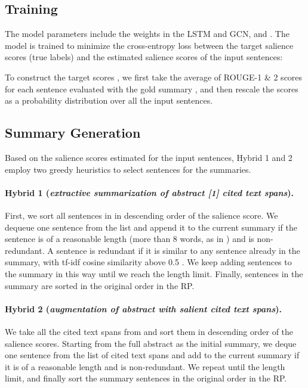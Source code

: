 \documentclass[letterpaper]{article} \usepackage{aaai19}  \usepackage{times}  \usepackage{helvet}  \usepackage{courier}  \usepackage{url}
\begin{document}
\subsection{Training}
The model parameters include the weights in the LSTM and GCN, and
.
The model is trained to minimize the cross-entropy loss between the target salience scores (true labels)  and the estimated salience scores  of the input sentences:

To construct the target scores , we first take the average of ROUGE-1 \& 2 scores for each sentence  evaluated with the gold summary \cite{cao2015ranking}, and then
rescale the
scores as a probability distribution over all the input sentences.



\subsection{Summary Generation}
Based on the salience scores estimated for the input sentences, Hybrid 1 and 2 employ two greedy heuristics to select sentences for the summaries.


\paragraph{Hybrid 1 ({\em extractive summarization of abstract \scalebox{0.95}[1]{} cited text spans}).}
First, we sort all sentences in  in descending order of the salience score.
We dequeue one sentence from the list and append it to the current summary if the sentence is of a reasonable length (more than 8 words, as in \cite{erkan2004lexrank}) and is non-redundant.
A sentence is
redundant if it is
similar to any sentence already in the summary, with tf-idf cosine similarity above 0.5 \cite{hong-nenkova:2014:EACL}.
We keep adding sentences to the summary in this way
until we reach the length limit.
Finally, sentences in the summary are sorted in the original order in the RP.


\paragraph{Hybrid 2 ({\em augmentation of abstract with salient cited text spans}).}

We take all the cited text spans from  and sort them in descending order of the salience scores.
Starting from the full abstract as the initial summary, we deque one sentence from the list of cited text spans and add to the current summary if it is of a reasonable length and is non-redundant.
We repeat until the length limit, and finally sort the summary sentences in the original order in the RP.
\end{document}
